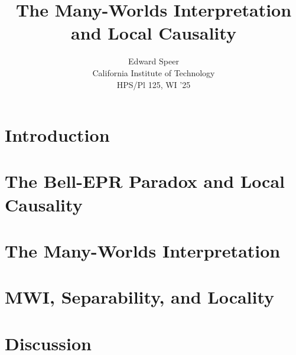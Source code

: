 \documentclass[11pt, a4paper]{article}
\title{The Many-Worlds Interpretation and Local Causality}
\author{%
  Edward Speer
  \\
  California Institute of Technology\\
  HPS/Pl 125, WI '25 \\
}
\date{\monthyeardate}
\begin{document}
\maketitle

\section{Introduction}



\section{The Bell-EPR Paradox and Local Causality}



\section{The Many-Worlds Interpretation}



\section{MWI, Separability, and Locality}



\section{Discussion}




\end{document}
